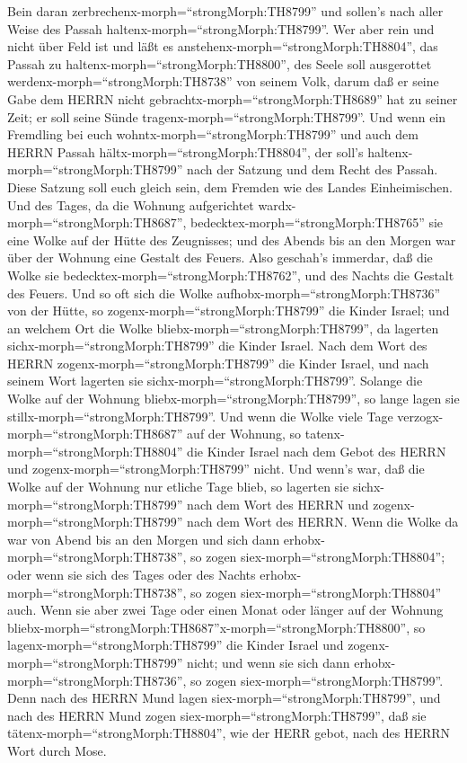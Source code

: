 Bein daran zerbrechenx-morph=``strongMorph:TH8799'' und sollen's nach
aller Weise des Passah haltenx-morph=``strongMorph:TH8799''.
 Wer aber rein und nicht über Feld ist und läßt es
anstehenx-morph=``strongMorph:TH8804'', das Passah zu
haltenx-morph=``strongMorph:TH8800'', des Seele soll ausgerottet
werdenx-morph=``strongMorph:TH8738'' von seinem Volk, darum daß er seine
Gabe dem HERRN nicht gebrachtx-morph=``strongMorph:TH8689'' hat zu
seiner Zeit; er soll seine Sünde tragenx-morph=``strongMorph:TH8799''.
 Und wenn ein Fremdling bei euch
wohntx-morph=``strongMorph:TH8799'' und auch dem HERRN Passah
hältx-morph=``strongMorph:TH8804'', der soll's
haltenx-morph=``strongMorph:TH8799'' nach der Satzung und dem Recht des
Passah. Diese Satzung soll euch gleich sein, dem Fremden wie des Landes
Einheimischen.  Und des Tages, da die Wohnung aufgerichtet
wardx-morph=``strongMorph:TH8687'',
bedecktex-morph=``strongMorph:TH8765'' sie eine Wolke auf der Hütte des
Zeugnisses; und des Abends bis an den Morgen war über der Wohnung eine
Gestalt des Feuers.  Also geschah's immerdar, daß die Wolke
sie bedecktex-morph=``strongMorph:TH8762'', und des Nachts die Gestalt
des Feuers.  Und so oft sich die Wolke
aufhobx-morph=``strongMorph:TH8736'' von der Hütte, so
zogenx-morph=``strongMorph:TH8799'' die Kinder Israel; und an welchem
Ort die Wolke bliebx-morph=``strongMorph:TH8799'', da lagerten
sichx-morph=``strongMorph:TH8799'' die Kinder Israel.  Nach
dem Wort des HERRN zogenx-morph=``strongMorph:TH8799'' die Kinder
Israel, und nach seinem Wort lagerten sie
sichx-morph=``strongMorph:TH8799''. Solange die Wolke auf der Wohnung
bliebx-morph=``strongMorph:TH8799'', so lange lagen sie
stillx-morph=``strongMorph:TH8799''.  Und wenn die Wolke
viele Tage verzogx-morph=``strongMorph:TH8687'' auf der Wohnung, so
tatenx-morph=``strongMorph:TH8804'' die Kinder Israel nach dem Gebot des
HERRN und zogenx-morph=``strongMorph:TH8799'' nicht.  Und
wenn's war, daß die Wolke auf der Wohnung nur etliche Tage blieb, so
lagerten sie sichx-morph=``strongMorph:TH8799'' nach dem Wort des HERRN
und zogenx-morph=``strongMorph:TH8799'' nach dem Wort des HERRN.
 Wenn die Wolke da war von Abend bis an den Morgen und sich
dann erhobx-morph=``strongMorph:TH8738'', so zogen
siex-morph=``strongMorph:TH8804''; oder wenn sie sich des Tages oder des
Nachts erhobx-morph=``strongMorph:TH8738'', so zogen
siex-morph=``strongMorph:TH8804'' auch.  Wenn sie aber zwei
Tage oder einen Monat oder länger auf der Wohnung
bliebx-morph=``strongMorph:TH8687''x-morph=``strongMorph:TH8800'', so
lagenx-morph=``strongMorph:TH8799'' die Kinder Israel und
zogenx-morph=``strongMorph:TH8799'' nicht; und wenn sie sich dann
erhobx-morph=``strongMorph:TH8736'', so zogen
siex-morph=``strongMorph:TH8799''.  Denn nach des HERRN
Mund lagen siex-morph=``strongMorph:TH8799'', und nach des HERRN Mund
zogen siex-morph=``strongMorph:TH8799'', daß sie
tätenx-morph=``strongMorph:TH8804'', wie der HERR gebot, nach des HERRN
Wort durch Mose.

